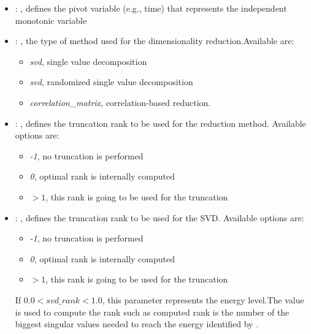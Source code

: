 \begin{itemize}
    \item {}: , 
      defines the pivot variable (e.g., time) that represents the
      independent monotonic variable

    \item {}: , 
      the type of method used for the dimensionality reduction.Available are:
      \begin{itemize}                                                     \item \textit{svd}, single
      value decomposition                                                     \item \textit{svd},
      randomized single value decomposition
      \item \textit{correlation\_matrix}, correlation-based reduction.
      \end{itemize}

    \item {}: , 
      defines the truncation rank to be used for the reduction method.
      Available options are:                                                  \begin{itemize}
      \item \textit{-1}, no truncation is performed
      \item \textit{0}, optimal rank is internally computed
      \item \textit{$>1$}, this rank is going to be used for the truncation
      \end{itemize}

    \item {}: , 
      defines the truncation rank to be used for the SVD.
      Available options are:                                                  \begin{itemize}
      \item \textit{-1}, no truncation is performed
      \item \textit{0}, optimal rank is internally computed
      \item \textit{$>1$}, this rank is going to be used for the truncation
      \end{itemize}                                                  If $0.0 < svd\_rank < 1.0$, this
      parameter represents the energy level.The value is used to compute the rank such
      as computed rank is the number of the biggest singular values needed to reach the energy
      identified by                                                    .


\end{itemize}

